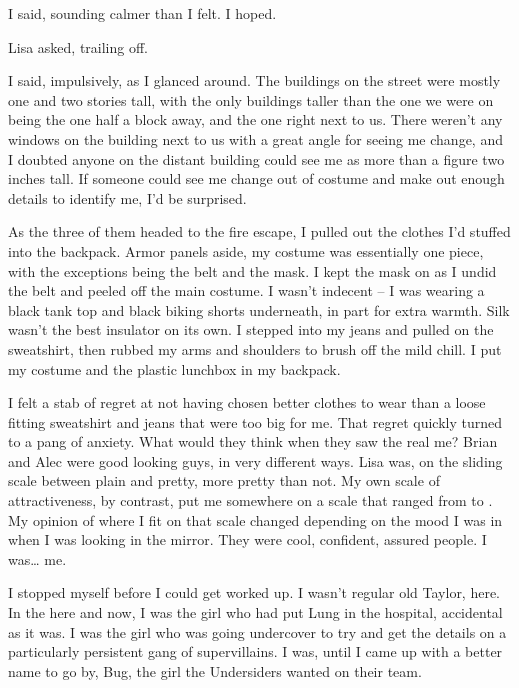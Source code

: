  I said, sounding calmer than I felt. I hoped. 

 Lisa asked, trailing off.

 I said, impulsively, as I glanced around. The buildings on the street were mostly one and two stories tall, with the only buildings taller than the one we were on being the one half a block away, and the one right next to us. There weren't any windows on the building next to us with a great angle for seeing me change, and I doubted anyone on the distant building could see me as more than a figure two inches tall. If someone could see me change out of costume and make out enough details to identify me, I'd be surprised.

As the three of them headed to the fire escape, I pulled out the clothes I'd stuffed into the backpack. Armor panels aside, my costume was essentially one piece, with the exceptions being the belt and the mask. I kept the mask on as I undid the belt and peeled off the main costume. I wasn't indecent -- I was wearing a black tank top and black biking shorts underneath, in part for extra warmth. Silk wasn't the best insulator on its own. I stepped into my jeans and pulled on the sweatshirt, then rubbed my arms and shoulders to brush off the mild chill. I put my costume and the plastic lunchbox in my backpack.

I felt a stab of regret at not having chosen better clothes to wear than a loose fitting sweatshirt and jeans that were too big for me. That regret quickly turned to a pang of anxiety. What would they think when they saw the real me? Brian and Alec were good looking guys, in very different ways. Lisa was, on the sliding scale between plain and pretty, more pretty than not. My own scale of attractiveness, by contrast, put me somewhere on a scale that ranged from  to . My opinion of where I fit on that scale changed depending on the mood I was in when I was looking in the mirror. They were cool, confident, assured people. I was\ldots{} me.

I stopped myself before I could get worked up. I wasn't regular old Taylor, here. In the here and now, I was the girl who had put Lung in the hospital, accidental as it was. I was the girl who was going undercover to try and get the details on a particularly persistent gang of supervillains. I was, until I came up with a better name to go by, Bug, the girl the Undersiders wanted on their team.


